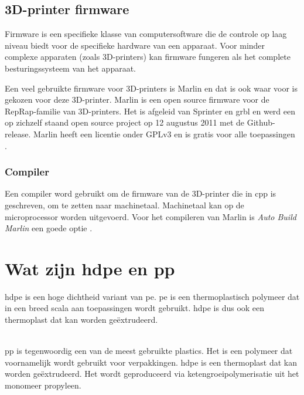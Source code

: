 \subsection{3D-printer firmware}

Firmware is een specifieke klasse van computersoftware die de controle op laag
niveau biedt voor de specifieke hardware van een apparaat.  Voor minder
complexe apparaten (zoals 3D-printers) kan firmware fungeren als het complete
besturingssysteem van het apparaat.

Een veel gebruikte firmware voor 3D-printers is Marlin en dat is ook waar voor
is gekozen voor deze 3D-printer.  Marlin is een open source firmware voor de
RepRap-familie van 3D-printers. Het is afgeleid van Sprinter en grbl en werd
een op zichzelf staand open source project op 12 augustus 2011 met de
Github-release. Marlin heeft een licentie onder GPLv3 en is gratis voor alle
toepassingen \cite{Marlin}. 

\subsubsection{Compiler}

Een compiler word gebruikt om de firmware van de 3D-printer die in \ac{cpp} is
geschreven, om te zetten naar machinetaal. Machinetaal kan op de microprocessor
worden uitgevoerd.  Voor het compileren van Marlin is \emph{Auto Build Marlin}
een goede optie \cite{Auto_Build_Marlin}.


\section{Wat zijn \ac{hdpe} en \ac{pp}}

\ac{hdpe} is een hoge dichtheid variant van \ac{pe}. \ac{pe} is een
thermoplastisch polymeer dat in een breed scala aan toepassingen wordt
gebruikt. \ac{hdpe} is dus ook een thermoplast dat kan worden geëxtrudeerd.\\\

\noindent \ac{pp} is tegenwoordig een van de meest gebruikte plastics. Het is
een polymeer dat voornamelijk wordt gebruikt voor verpakkingen. \ac{hdpe} is
een thermoplast dat kan worden geëxtrudeerd. Het wordt geproduceerd via
ketengroeipolymerisatie uit het monomeer propyleen.

